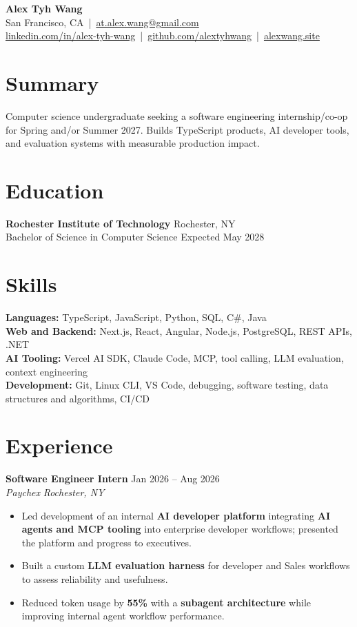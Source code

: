 \documentclass[10pt,letterpaper]{article}
\newif\ifresumeFirstRole
\newcommand{\resumeRole}[4]{%
  \ifresumeFirstRole
    \global\resumeFirstRolefalse
  \else
    \vspace{0pt plus 1fill}%
  \fi
  \textbf{#1} \hfill #2\\
  \textit{#3} \hfill \textit{#4}
}
\begin{document}
\begin{center}
{\Large \textbf{Alex Tyh Wang}}\\
San Francisco, CA \,|\, \href{mailto:at.alex.wang@gmail.com}{at.alex.wang@gmail.com}\\
\small \href{https://www.linkedin.com/in/alex-tyh-wang/}{linkedin.com/in/alex-tyh-wang} \,|\, \href{https://github.com/alextyhwang}{github.com/alextyhwang} \,|\, \href{https://alexwang.site}{alexwang.site}
\end{center}

\section*{Summary}
Computer science undergraduate seeking a software engineering internship/co-op for Spring and/or Summer 2027. Builds TypeScript products, AI developer tools, and evaluation systems with measurable production impact.

\section*{Education}
\textbf{Rochester Institute of Technology} \hfill Rochester, NY\\
Bachelor of Science in Computer Science \hfill Expected May 2028

\section*{Skills}
\textbf{Languages:} TypeScript, JavaScript, Python, SQL, C\#, Java\\
\textbf{Web and Backend:} Next.js, React, Angular, Node.js, PostgreSQL, REST APIs, .NET\\
\textbf{AI Tooling:} Vercel AI SDK, Claude Code, MCP, tool calling, LLM evaluation, context engineering\\
\textbf{Development:} Git, Linux CLI, VS Code, debugging, software testing, data structures and algorithms, CI/CD

\section*{Experience}
\resumeRole{Software Engineer Intern}{Jan 2026 -- Aug 2026}{Paychex}{Rochester, NY}
\begin{itemize}
  \item Led development of an internal \textbf{AI developer platform} integrating \textbf{AI agents and MCP tooling} into enterprise developer workflows; presented the platform and progress to executives.
  \item Built a custom \textbf{LLM evaluation harness} for developer and Sales workflows to assess reliability and usefulness.
  \item Reduced token usage by \textbf{55\%} with a \textbf{subagent architecture} while improving internal agent workflow performance.
\end{itemize}
\end{document}
